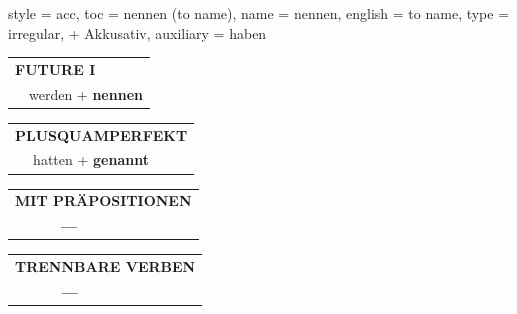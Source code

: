 \begin{verbentry}{
  style = {acc},
  toc = {nennen (to name)},
  name = {nennen},
  english = {to name},
  type = {irregular, + Akkusativ},
  auxiliary = {haben}
}
\begin{tabular}{rl}
    \multicolumn{2}{l}{\textbf{FUTURE I} }\\
   & werden + \textbf{nennen}\\
 
  \end{tabular}
\hfill
   \begin{tabular}{rl}
      \multicolumn{2}{l}{\textbf{PLUSQUAMPERFEKT}}\\
   & hatten + \textbf{genannt}\\
  \end{tabular}
  
  
\vspace{10pt}

\begin{tabular}{lll}
\multicolumn{3}{l}{\textbf{MIT PRÄPOSITIONEN}}\\
& \textbf{---} & \\
\end{tabular}
\hfill
\begin{tabular}{lll}
\multicolumn{3}{l}{\textbf{TRENNBARE VERBEN}}\\
& \textbf{---} & \\
\end{tabular}
\vspace{-5pt}
\end{verbentry}

